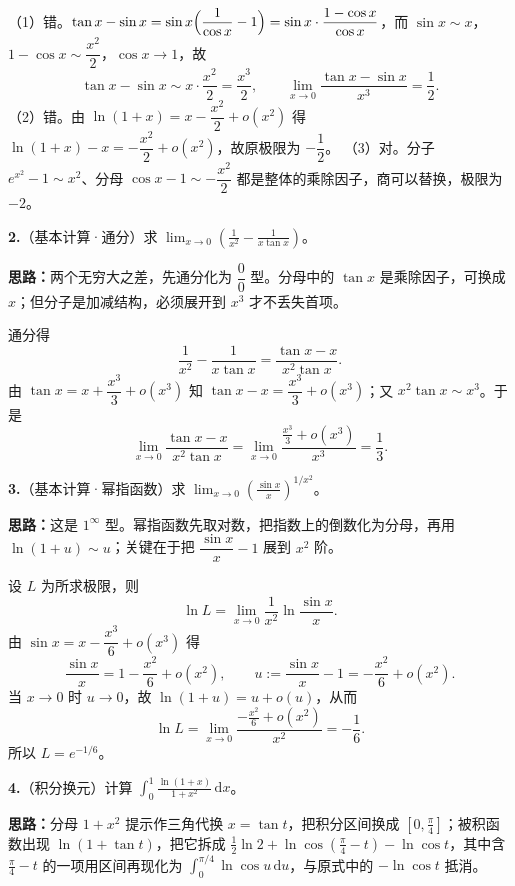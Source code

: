 （1）错。$\tan x-\sin x=\sin x\Bigl(\dfrac{1}{\cos x}-1\Bigr)=\sin x\cdot\dfrac{1-\cos x}{\cos x}$，而 $\sin x\sim x$，$1-\cos x\sim\dfrac{x^{2}}{2}$，$\cos x\to1$，故
\[
\tan x-\sin x\sim x\cdot\frac{x^{2}}{2}=\frac{x^{3}}{2},\qquad
\lim_{x\to0}\frac{\tan x-\sin x}{x^{3}}=\frac{1}{2}.
\]
（2）错。由 $\ln(1+x)=x-\dfrac{x^{2}}{2}+o(x^{2})$ 得 $\ln(1+x)-x=-\dfrac{x^{2}}{2}+o(x^{2})$，故原极限为 $-\dfrac{1}{2}$。
（3）对。分子 $e^{x^{2}}-1\sim x^{2}$、分母 $\cos x-1\sim-\dfrac{x^{2}}{2}$ 都是整体的乘除因子，商可以替换，极限为 $-2$。


\else \answerarea[8] \fi%
\textbf{2.}（基本计算·通分）求 $\displaystyle\lim_{x\to0}\left(\frac{1}{x^{2}}-\frac{1}{x\tan x}\right)$。

\ifshowsolutions%
\textbf{思路：}两个无穷大之差，先通分化为 $\dfrac{0}{0}$ 型。分母中的 $\tan x$ 是乘除因子，可换成 $x$；但分子是加减结构，必须展开到 $x^{3}$ 才不丢失首项。

通分得
\[
\frac{1}{x^{2}}-\frac{1}{x\tan x}=\frac{\tan x-x}{x^{2}\tan x}.
\]
由 $\tan x=x+\dfrac{x^{3}}{3}+o(x^{3})$ 知 $\tan x-x=\dfrac{x^{3}}{3}+o(x^{3})$；又 $x^{2}\tan x\sim x^{3}$。于是
\[
\lim_{x\to0}\frac{\tan x-x}{x^{2}\tan x}
=\lim_{x\to0}\frac{\frac{x^{3}}{3}+o(x^{3})}{x^{3}}=\frac{1}{3}.
\]


\else \answerarea[8] \fi%
\textbf{3.}（基本计算·幂指函数）求 $\displaystyle\lim_{x\to0}\left(\frac{\sin x}{x}\right)^{1/x^{2}}$。

\ifshowsolutions%
\textbf{思路：}这是 $1^{\infty}$ 型。幂指函数先取对数，把指数上的倒数化为分母，再用 $\ln(1+u)\sim u$；关键在于把 $\dfrac{\sin x}{x}-1$ 展到 $x^{2}$ 阶。

设 $L$ 为所求极限，则
\[
\ln L=\lim_{x\to0}\frac{1}{x^{2}}\ln\frac{\sin x}{x}.
\]
由 $\sin x=x-\dfrac{x^{3}}{6}+o(x^{3})$ 得
\[
\frac{\sin x}{x}=1-\frac{x^{2}}{6}+o(x^{2}),\qquad
u:=\frac{\sin x}{x}-1=-\frac{x^{2}}{6}+o(x^{2}).
\]
当 $x\to0$ 时 $u\to0$，故 $\ln(1+u)=u+o(u)$，从而
\[
\ln L=\lim_{x\to0}\frac{-\frac{x^{2}}{6}+o(x^{2})}{x^{2}}=-\frac{1}{6}.
\]
所以 $L=e^{-1/6}$。


\else \answerarea[8] \fi%
\textbf{4.}（积分换元）计算 $\displaystyle\int_{0}^{1}\frac{\ln(1+x)}{1+x^{2}}\,\mathrm{d}x$。

\ifshowsolutions%
\textbf{思路：}分母 $1+x^{2}$ 提示作三角代换 $x=\tan t$，把积分区间换成 $[0,\frac{\pi}{4}]$；被积函数出现 $\ln(1+\tan t)$，把它拆成 $\frac{1}{2}\ln2+\ln\cos(\frac{\pi}{4}-t)-\ln\cos t$，其中含 $\frac{\pi}{4}-t$ 的一项用区间再现化为 $\int_{0}^{\pi/4}\ln\cos u\,\mathrm{d}u$，与原式中的 $-\ln\cos t$ 抵消。

